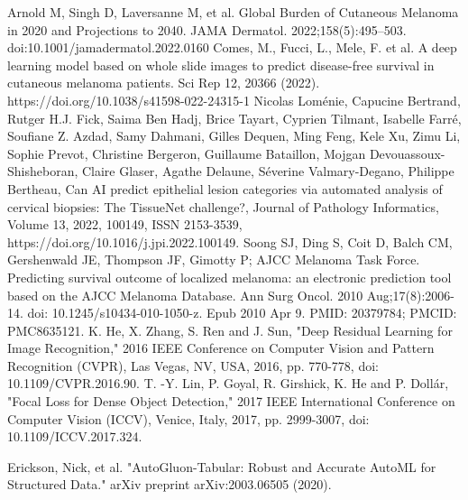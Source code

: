 \documentclass[conference]{IEEEtran}
\begin{document}
\begin{thebibliography}{00}
 Arnold M, Singh D, Laversanne M, et al. Global Burden of Cutaneous Melanoma in 2020 and Projections to 2040. JAMA Dermatol. 2022;158(5):495–503. doi:10.1001/jamadermatol.2022.0160
 Comes, M., Fucci, L., Mele, F. et al. A deep learning model based on whole slide images to predict disease-free survival in cutaneous melanoma patients. Sci Rep 12, 20366 (2022). https://doi.org/10.1038/s41598-022-24315-1
 Nicolas Loménie, Capucine Bertrand, Rutger H.J. Fick, Saima Ben Hadj, Brice Tayart, Cyprien Tilmant, Isabelle Farré, Soufiane Z. Azdad, Samy Dahmani, Gilles Dequen, Ming Feng, Kele Xu, Zimu Li, Sophie Prevot, Christine Bergeron, Guillaume Bataillon, Mojgan Devouassoux-Shisheboran, Claire Glaser, Agathe Delaune, Séverine Valmary-Degano, Philippe Bertheau,
Can AI predict epithelial lesion categories via automated analysis of cervical biopsies: The TissueNet challenge?, Journal of Pathology Informatics, Volume 13, 2022, 100149, ISSN 2153-3539,
https://doi.org/10.1016/j.jpi.2022.100149.
 Soong SJ, Ding S, Coit D, Balch CM, Gershenwald JE, Thompson JF, Gimotty P; AJCC Melanoma Task Force. Predicting survival outcome of localized melanoma: an electronic prediction tool based on the AJCC Melanoma Database. Ann Surg Oncol. 2010 Aug;17(8):2006-14. doi: 10.1245/s10434-010-1050-z. Epub 2010 Apr 9. PMID: 20379784; PMCID: PMC8635121.
 K. He, X. Zhang, S. Ren and J. Sun, "Deep Residual Learning for Image Recognition," 2016 IEEE Conference on Computer Vision and Pattern Recognition (CVPR), Las Vegas, NV, USA, 2016, pp. 770-778, doi: 10.1109/CVPR.2016.90.
 T. -Y. Lin, P. Goyal, R. Girshick, K. He and P. Dollár, "Focal Loss for Dense Object Detection," 2017 IEEE International Conference on Computer Vision (ICCV), Venice, Italy, 2017, pp. 2999-3007, doi: 10.1109/ICCV.2017.324.

 Erickson, Nick, et al. "AutoGluon-Tabular: Robust and Accurate AutoML for Structured Data." arXiv preprint arXiv:2003.06505 (2020).

\end{thebibliography}
\end{document}
